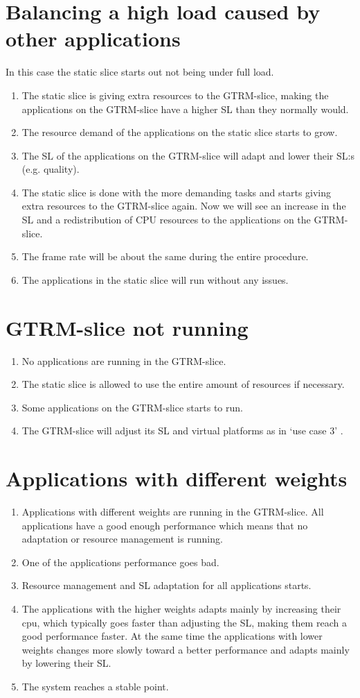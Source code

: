 \documentclass[nobiblatex]{LTHthesis}
\begin{document}
\section{Balancing a high load caused by other applications}
In this case the static slice starts out not being under full load.
\begin{enumerate}
\item The static slice is giving extra resources to the GTRM-slice, making the applications on the GTRM-slice have a higher SL than they normally would.
\item The resource demand of the applications on the static slice starts to grow. 
\item The SL of the applications on the GTRM-slice will adapt and lower their SL:s (e.g. quality).
\item The static slice is done with the more demanding tasks and starts giving extra resources to the GTRM-slice again. Now we will see an increase in the SL and a redistribution of CPU resources to the applications on the GTRM-slice.
\item The frame rate will be about the same during the entire procedure.
\item The applications in the static slice will run without any issues.
\end{enumerate}
\section{GTRM-slice not running}
\begin{enumerate}
\item No applications are running in the GTRM-slice.
\item The static slice is allowed to use the entire amount of resources if necessary.
\item Some applications on the GTRM-slice starts to run.
\item The GTRM-slice will adjust its SL and virtual platforms as in ‘use case 3’ .
\end{enumerate}

\section{Applications with different weights}
\begin{enumerate}
\item Applications with different weights are running in the GTRM-slice. All applications have a good enough performance which means that no adaptation or resource management is running. 
\item One of the applications performance goes bad.
\item Resource management and SL adaptation for all applications starts.
\item The applications with the higher weights adapts mainly by increasing their cpu, which typically goes faster than adjusting the SL, making them reach a good performance faster. At the same time the applications with lower weights changes more slowly toward a better performance and adapts mainly by lowering their SL.
\item The system reaches a stable point.
\end{enumerate}
\end{document}
